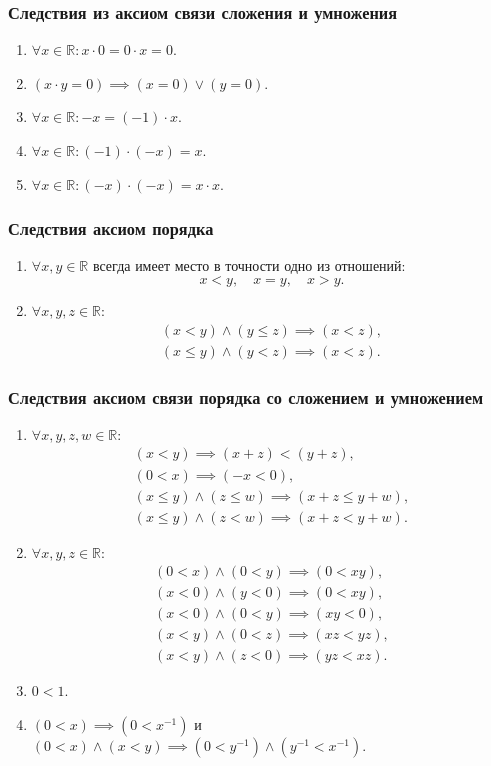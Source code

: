 \documentclass[12pt]{report}
\theoremstyle{definition}
\newcommand{\R}{\mathbb R}
\begin{document}
\subsubsection{Следствия из аксиом связи сложения и умножения}
\begin{enumerate}
\item $\forall x \in \R: x \cdot 0 = 0 \cdot x = 0$.
\item $(x \cdot y = 0) \implies (x = 0) \lor (y = 0)$.
\item $\forall x \in \R: -x = (-1) \cdot x$.
\item $\forall x \in \R: (-1) \cdot (-x) = x$.
\item $\forall x \in \R: (-x) \cdot (-x) = x \cdot x$.
\end{enumerate}

\subsubsection{Следствия аксиом порядка}
\begin{enumerate}
\item $\forall x, y \in \R$ всегда имеет место в точности одно из отношений:
$$
x < y, \quad x = y, \quad x > y.
$$
\item $\forall x, y, z \in \R$:
  \begin{gather*}
    (x < y) \land (y \le z) \implies (x < z), \\
    (x \le y) \land (y < z) \implies (x < z).
  \end{gather*}
\end{enumerate}

\subsubsection{Следствия аксиом связи порядка со сложением и умножением}
\begin{enumerate}
\item $\forall x, y, z, w \in \R$:
  \begin{gather*}
    (x < y) \implies (x + z) < (y + z), \\
    (0 < x) \implies (-x < 0), \\
    (x \le y) \land (z \le w) \implies (x + z \le y + w), \\
    (x \le y) \land  (z < w) \implies (x + z < y + w).
  \end{gather*}
\item $\forall x, y, z \in \R$:
  \begin{gather*}
    (0 < x) \land (0 < y) \implies (0 < xy), \\
    (x < 0) \land (y < 0) \implies (0 < xy), \\
    (x < 0) \land (0 < y) \implies (xy < 0), \\
    (x < y) \land (0 < z) \implies (xz < yz), \\
    (x < y) \land (z < 0) \implies (yz < xz).
  \end{gather*}
\item $0 < 1$.
\item $(0 < x) \implies (0 < x^{-1})$ и $(0 < x) \land (x < y) \implies (0 < y^{-1}) \land (y^{-1} < x^{-1}).$
\end{enumerate}
\end{document}
